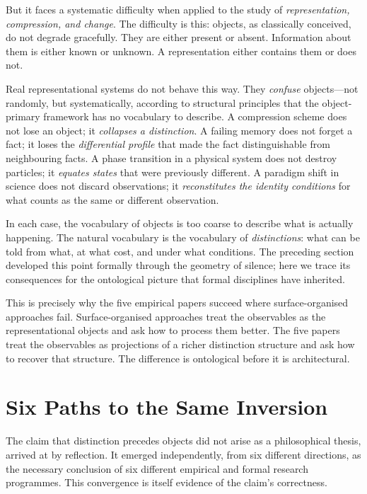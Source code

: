 \documentclass[12pt, letterpaper]{article}
\theoremstyle{remark}
\begin{document}
But it faces a systematic difficulty when applied to the study of
\emph{representation, compression, and change}.  The difficulty is this:
objects, as classically conceived, do not degrade gracefully.  They are
either present or absent.  Information about them is either known or unknown.
A representation either contains them or does not.

Real representational systems do not behave this way.  They \emph{confuse}
objects---not randomly, but systematically, according to structural principles
that the object-primary framework has no vocabulary to describe.  A
compression scheme does not lose an object; it \emph{collapses a
distinction}.  A failing memory does not forget a fact; it loses the
\emph{differential profile} that made the fact distinguishable from
neighbouring facts.  A phase transition in a physical system does not
destroy particles; it \emph{equates states} that were previously different.
A paradigm shift in science does not discard observations; it
\emph{reconstitutes the identity conditions} for what counts as the same
or different observation.

In each case, the vocabulary of objects is too coarse to describe what is
actually happening.  The natural vocabulary is the vocabulary of
\emph{distinctions}: what can be told from what, at what cost, and under
what conditions.  The preceding section developed this point formally through
the geometry of silence; here we trace its consequences for the ontological
picture that formal disciplines have inherited.

This is precisely why the five empirical papers succeed where surface-organised
approaches fail.  Surface-organised approaches treat the observables as the
representational objects and ask how to process them better.  The five papers
treat the observables as projections of a richer distinction structure and
ask how to recover that structure.  The difference is ontological before
it is architectural.

\section{Six Paths to the Same Inversion}

The claim that distinction precedes objects did not arise as a philosophical
thesis, arrived at by reflection.  It emerged independently, from six
different directions, as the necessary conclusion of six different empirical
and formal research programmes.  This convergence is itself evidence of the
claim's correctness.
\end{document}
